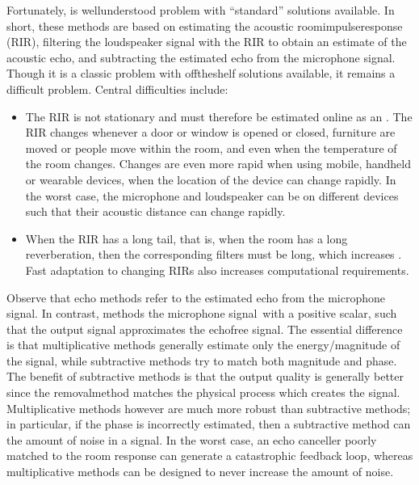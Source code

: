 \documentclass[letterpaper,10pt,english]{jupyterBook}
\begin{document}
\sphinxAtStartPar
Fortunately,  is well\sphinxhyphen{}understood problem with
“standard” solutions available. In short, these methods are based on
estimating the acoustic room\sphinxhyphen{}impulse\sphinxhyphen{}response (RIR), filtering the
loudspeaker signal with the RIR to obtain an estimate of the acoustic
echo, and subtracting the estimated echo from the microphone signal.
Though it is a classic problem with off\sphinxhyphen{}the\sphinxhyphen{}shelf solutions available,
it remains a difficult problem. Central difficulties include:
\begin{itemize}
\item {} 
\sphinxAtStartPar
The RIR is not stationary and must therefore be estimated on\sphinxhyphen{}line as
an . The RIR changes whenever a door or window is
opened or closed, furniture are moved or people move within the
room, and even when the temperature of the room changes. Changes are
even more rapid when using mobile, handheld or wearable devices,
when the location of the device can change rapidly. In the worst
case, the microphone and loudspeaker can be on different devices
such that their acoustic distance can change rapidly.

\item {} 
\sphinxAtStartPar
When the RIR has a long tail, that is, when the room has a long
reverberation, then the corresponding filters must be long, which
increases . Fast adaptation to changing
RIRs also increases computational requirements.

\end{itemize}

\sphinxAtStartPar
Observe that echo  methods refer to  the
estimated echo from the microphone signal. In contrast, {\hyperref[\detokenize{Enhancement/Noise_attenuation::doc}]{}} methods  the microphone
signal with a positive scalar, such that the output signal approximates
the echo\sphinxhyphen{}free signal. The essential difference is that multiplicative
methods generally estimate only the energy/magnitude of the signal,
while subtractive methods try to match both magnitude and phase. The
benefit of subtractive methods is that the output quality is generally
better since the removal\sphinxhyphen{}method matches the physical process which
creates the signal. Multiplicative methods however are much more robust
than subtractive methods; in particular, if the phase is incorrectly
estimated, then a subtractive method can  the amount of noise
in a signal. In the worst case, an echo canceller poorly matched to the
room response can generate a catastrophic feedback loop, whereas
multiplicative methods can be designed to never increase the amount of
noise.
\end{document}

